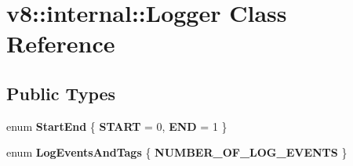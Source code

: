 \hypertarget{classv8_1_1internal_1_1_logger}{}\section{v8\+:\+:internal\+:\+:Logger Class Reference}
\label{classv8_1_1internal_1_1_logger}
\subsection*{Public Types}
\begin{DoxyCompactItemize}
\item 
\hypertarget{classv8_1_1internal_1_1_logger_ae1d0584967c39c5e1a33a9d8a16ce1e7}{}enum {\bfseries Start\+End} \{ {\bfseries S\+T\+A\+R\+T} = 0, 
{\bfseries E\+N\+D} = 1
 \}\label{classv8_1_1internal_1_1_logger_ae1d0584967c39c5e1a33a9d8a16ce1e7}

\item 
\hypertarget{classv8_1_1internal_1_1_logger_af031bcdf46403d7334622c4c1df6777a}{}enum {\bfseries Log\+Events\+And\+Tags} \{ {\bfseries N\+U\+M\+B\+E\+R\+\_\+\+O\+F\+\_\+\+L\+O\+G\+\_\+\+E\+V\+E\+N\+T\+S}
 \}\label{classv8_1_1internal_1_1_logger_af031bcdf46403d7334622c4c1df6777a}

\end{DoxyCompactItemize}
